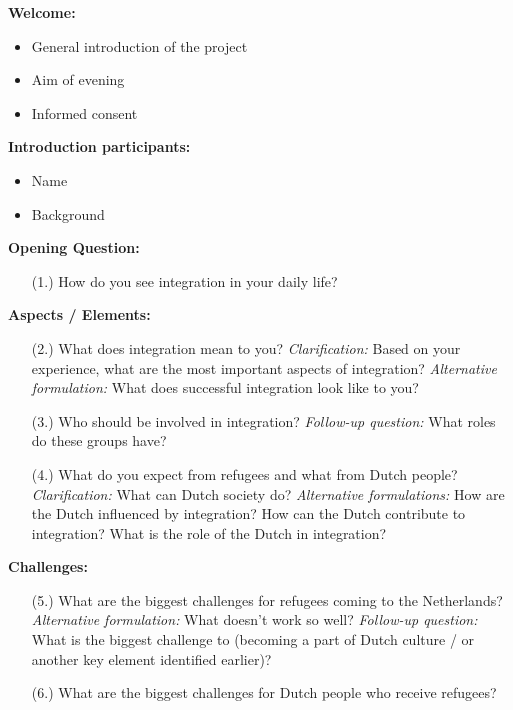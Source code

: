 \documentclass[man, 12pt, a4paper]{apa7}
\begin{document}
{\parindent0pt %

\textbf{Welcome:}
\begin{itemize}[noitemsep,topsep=0pt]
    \item General introduction of the project
    \item Aim of evening
    \item Informed consent
\end{itemize}

\textbf{Introduction participants:}
\begin{itemize}[noitemsep,topsep=0pt]
    \item Name
    \item Background
\end{itemize}

\textbf{Opening Question:}
\begin{enumerate}[noitemsep,topsep=0pt]
    \item [(1.)] How do you see integration in your daily life?
\end{enumerate}

\textbf{Aspects / Elements:}
\begin{enumerate}[noitemsep,topsep=0pt]
    \item [(2.)] What does integration mean to you?\newline
    \textit{Clarification:} Based on your experience, what are the most important aspects of integration?\newline
    \textit{Alternative formulation:} What does successful integration look like to you?
    \item [(3.)] Who should be involved in integration?\newline
    \textit{Follow-up question:} What roles do these groups have?
    \item [(4.)] What do you expect from refugees and what from Dutch people?\newline
    \textit{Clarification:} What can Dutch society do?\newline
    \textit{Alternative formulations:} How are the Dutch influenced by integration? How can the Dutch contribute to integration? What is the role of the Dutch in integration?
\end{enumerate}

\textbf{Challenges:}
\begin{enumerate}[noitemsep,topsep=0pt]
    \item [(5.)] What are the biggest challenges for refugees coming to the Netherlands?\newline
    \textit{Alternative formulation:} What doesn't work so well?\newline
    \textit{Follow-up question:} What is the biggest challenge to (becoming a part of Dutch culture / or another key element identified earlier)?
    \item [(6.)] What are the biggest challenges for Dutch people who receive refugees?
\end{enumerate}

}
\end{document}
